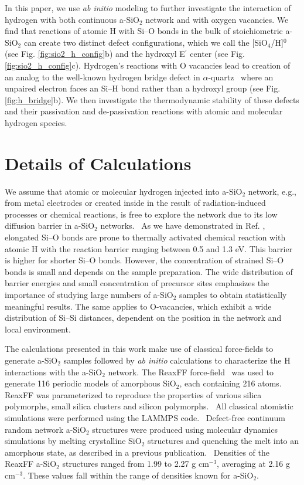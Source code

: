 \documentclass[aps,prb,reprint,superscriptaddress,showpacs]{revtex4-1}
\begin{document}
In this paper, we use \emph{ab initio} modeling to further investigate the interaction of hydrogen with both continuous a-SiO$_2$ network and with oxygen vacancies. We find that reactions of atomic H with \mbox{Si--O} bonds in the bulk of stoichiometric a-SiO$_2$ can create two distinct defect configurations, which we call the [SiO$_4$/H]$^0$ (see Fig. \ref{fig:sio2_h_config}b) and the hydroxyl E$^\prime$ center (see Fig. \ref{fig:sio2_h_config}c). Hydrogen's reactions with O vacancies lead to creation of an analog to the well-known hydrogen bridge defect in $\alpha$-quartz~\cite{blochl_vacancies,alkauskas_h} where an unpaired electron faces an \mbox{Si--H} bond rather than a hydroxyl group (see Fig. \ref{fig:h_bridge}b). We then investigate the thermodynamic stability of these defects and their passivation and de-passivation reactions with atomic and molecular hydrogen species. 

\section{Details of Calculations}
\label{sec:calc_details}

We assume that atomic or molecular hydrogen injected into a-SiO$_2$ network, e.g., from metal electrodes or created inside in the result of radiation-induced processes or chemical reactions, is free to explore the network due to its low diffusion barrier in a-SiO$_2$ networks.~\cite{kajihara_hydrogen,skuja_hdiffusion} As we have demonstrated in Ref. \cite{aelsayed_prl}, elongated \mbox{Si--O} bonds are prone to thermally activated chemical reaction with atomic H with the reaction barrier ranging between 0.5 and 1.3 eV. This barrier is higher for shorter \mbox{Si--O} bonds. However, the concentration of strained \mbox{Si--O} bonds is small and depends on the sample preparation. The wide distribution of barrier energies and small concentration of precursor sites emphasizes the importance of studying large numbers of a-SiO$_2$ samples to obtain statistically meaningful results. The same applies to O-vacancies, which exhibit a wide distribution of \mbox{Si--Si} distances, dependent on the position in the network and local environment.~\cite{asio2_3}

The calculations presented in this work make use of classical force-fields to generate a-SiO$_2$ samples followed by \emph{ab initio} calculations to characterize the H interactions with the a-SiO$_2$ network. The ReaxFF force-field~\cite{reaxff_sisio} was used to generate 116 periodic models of amorphous SiO$_{2}$, each containing 216 atoms. ReaxFF was parameterized to reproduce the properties of various silica polymorphs, small silica clusters and silicon polymorphs.~\cite{reaxff_h2o} All classical atomistic simulations were performed using the LAMMPS code.~\cite{lammps} Defect-free continuum random network a-SiO$_2$ structures were produced using molecular dynamics simulations by melting crystalline SiO$_2$ structures and quenching the melt into an amorphous state, as described in a previous publication.~\cite{aelsayed_prb} Densities of the ReaxFF a-SiO$_2$ structures ranged from 1.99 to 2.27 g cm$^{-3}$, averaging at 2.16 g cm$^{-3}$. These values fall within the range of densities known for a-SiO$_2$.  
\end{document}
